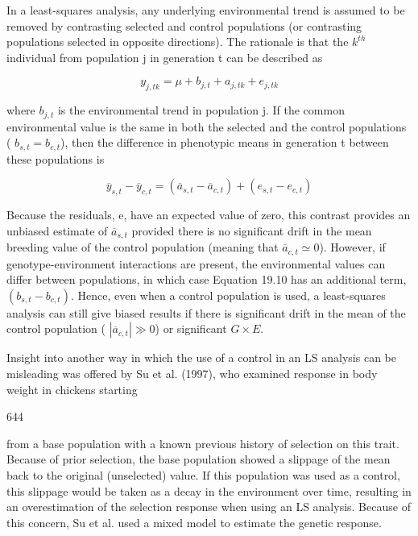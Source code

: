 \documentclass{article}
\begin{document}
In a least-squares analysis, any underlying environmental trend is assumed to be removed by contrasting selected and control populations (or contrasting populations selected in opposite directions). The rationale is that the  $ k^{th} $ individual from population j in generation t can be described as

\begin{equation}
y_{j,t k}=\mu+b_{j,t}+a_{j,t k}+e_{j,t k}
\tag{19.9}
\label{eq:19_9}
\end{equation}

where  $ b_{j,t} $ is the environmental trend in population j. If the common environmental value is the same in both the selected and the control populations ( $ b_{s,t} = b_{c,t} $), then the difference in phenotypic means in generation t between these populations is

\begin{equation}
\overline{y}_{s,t}-\overline{y}_{c,t}=\left(\overline{a}_{s,t}-\overline{a}_{c,t}\right)+\left(e_{s,t}-e_{c,t}\right)
\tag{19.10}
\label{eq:19_10}
\end{equation}

Because the residuals, e, have an expected value of zero, this contrast provides an unbiased estimate of  $ \overline{a}_{s,t} $ provided there is no significant drift in the mean breeding value of the control population (meaning that  $ \overline{a}_{c,t} \simeq 0 $). However, if genotype-environment interactions are present, the environmental values can differ between populations, in which case Equation 19.10 has an additional term,  $ (b_{s,t} - b_{c,t}) $. Hence, even when a control population is used, a least-squares analysis can still give biased results if there is significant drift in the mean of the control population ( $ |\overline{a}_{c,t}| \gg 0 $) or significant  $ G \times E $.

Insight into another way in which the use of a control in an LS analysis can be misleading was offered by Su et al. (1997), who examined response in body weight in chickens starting

644

from a base population with a known previous history of selection on this trait. Because of prior selection, the base population showed a slippage of the mean back to the original (unselected) value. If this population was used as a control, this slippage would be taken as a decay in the environment over time, resulting in an overestimation of the selection response when using an LS analysis. Because of this concern, Su et al. used a mixed model to estimate the genetic response.
\end{document}
